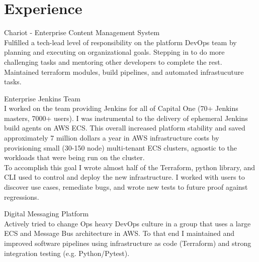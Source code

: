 \documentclass[]{resume}
\begin{document}
\begin{minipage}[t]{0.69\textwidth} 


\section{Experience}

Chariot - Enterprise Content Management System \\
\vspace{1mm}
Fulfilled a tech-lead level of responsibility on the platform DevOps team by planning and executing on organizational goals. Stepping in to do more challenging tasks and mentoring other developers to complete the rest. Maintained terraform modules, build pipelines, and automated infrastucuture tasks.
\sectionsep

Enterprise Jenkins Team \\
\vspace{1mm}
I worked on the team providing Jenkins for all of Capital One (70+ Jenkins masters, 7000+ users). 
I was instrumental to the delivery of ephemeral Jenkins build agents on AWS ECS.
This overall increased platform stability and saved approximately 7 million dollars a year in 
AWS infrastructure costs by provisioning small (30-150 node) multi-tenant ECS clusters, 
agnostic to the workloads that were being run on the cluster. \\
\vspace{1mm}
To accomplish this goal I wrote almost half of the Terraform, python library, and CLI used to control and deploy the new infrastructure. I worked with users to discover use cases, remediate bugs, and wrote new tests to future proof against regressions.
\sectionsep

Digital Messaging Platform \\
\vspace{1mm}
Actively tried to change Ops heavy DevOps culture in a group that uses a large ECS and Message Bus architecture in AWS. 
To that end I maintained and improved software pipelines using infrastructure as code (Terraform) 
and strong integration testing (e.g. Python/Pytest). \\


\end{minipage}
\end{document}
